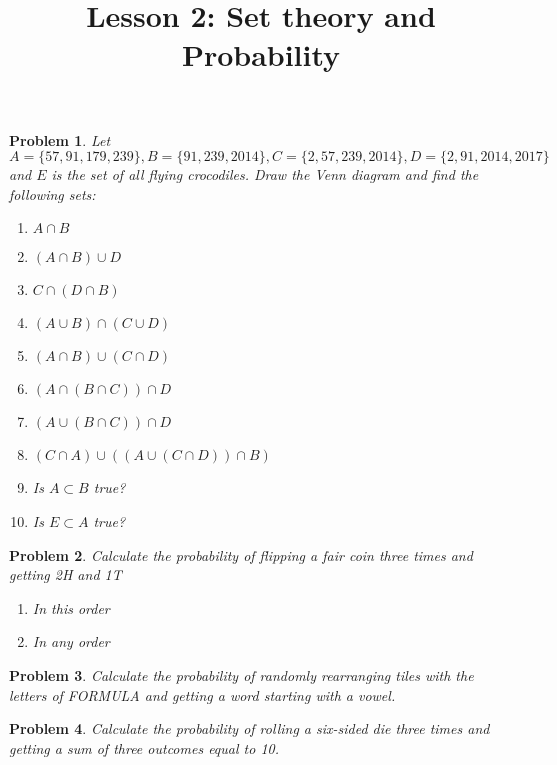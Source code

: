 \documentclass[a4paper,12pt]{article}
\title{Lesson 2: Set theory and Probability }
\theoremstyle{perfect}
\newtheorem{prb}{Problem}
\begin{document}
 
\maketitle

\begin{prb}
Let $A = \{57, 91, 179, 239\}, B = \{91, 239, 2014\}, C = \{2, 57, 239, 2014\},
D = \{2, 91, 2014, 2017\}$ and $E$ is the set of all flying crocodiles. 
Draw the Venn diagram and find the following sets:
\begin{enumerate}
\item  $A \cap B$
\item $(A \cap B) \cup D$
\item $C \cap (D \cap B)$
\item $(A \cup B) \cap (C \cup D)$
\item $(A \cap B) \cup (C \cap D)$ 
\item $(A \cap (B \cap C)) \cap D$
\item $(A \cup (B \cap C)) \cap D$
\item $(C \cap A) \cup ((A \cup (C \cap D)) \cap B)$
\item Is $A \subset B$ true?
\item Is $E \subset A$ true?
\end{enumerate}

\end{prb}

\begin{prb}
Calculate the probability of flipping a fair coin three times and getting 2H and 1T 
\begin{enumerate}
\item In this order
\item In any order
\end{enumerate}
\end{prb} 

\begin{prb}
Calculate the probability of randomly rearranging tiles with the letters of FORMULA and getting a word starting with a vowel.
\end{prb} 

\begin{prb}
Calculate the probability of rolling a six-sided die three times and getting a sum of three outcomes equal to 10.
\end{prb} 
\end{document}
